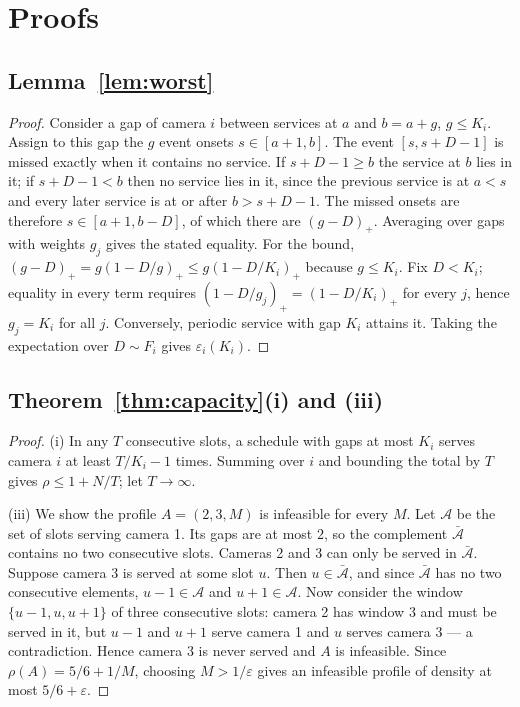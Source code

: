 \documentclass[final,5p,times,twocolumn]{elsarticle}
\theoremstyle{definition}
\newcommand{\Nc}{N}
\newcommand{\Ki}{K_i}
\newcommand{\dens}{\rho}
\newcommand{\Dur}{D}
\newcommand{\pos}[1]{(#1)_{+}}
\begin{document}
\appendix
\section{Proofs}\label{app:proofs}

\subsection*{Lemma~\ref{lem:worst}}
\begin{proof}
Consider a gap of camera $i$ between services at $a$ and $b=a+g$, $g\le\Ki$. Assign to this gap
the $g$ event onsets $s\in[a+1,b]$. The event $[s,s+\Dur-1]$ is missed exactly when it contains no
service. If $s+\Dur-1\ge b$ the service at $b$ lies in it; if $s+\Dur-1<b$ then no service lies in
it, since the previous service is at $a<s$ and every later service is at or after $b>s+\Dur-1$.
The missed onsets are therefore $s\in[a+1,b-\Dur]$, of which there are $\pos{g-\Dur}$. Averaging
over gaps with weights $g_j$ gives the stated equality. For the bound, $\pos{g-\Dur}=g\pos{1-\Dur/g}
\le g\pos{1-\Dur/\Ki}$ because $g\le\Ki$. Fix $\Dur<\Ki$; equality in every term requires
$\pos{1-\Dur/g_j}=\pos{1-\Dur/\Ki}$ for every $j$, hence $g_j=\Ki$ for all $j$. Conversely,
periodic service with gap $\Ki$ attains it. Taking the expectation over $\Dur\sim F_i$ gives
$\varepsilon_i(\Ki)$.
\end{proof}

\subsection*{Theorem~\ref{thm:capacity}(i) and (iii)}
\begin{proof}
(i) In any $T$ consecutive slots, a schedule with gaps at most $\Ki$ serves camera $i$ at least
$T/\Ki-1$ times. Summing over $i$ and bounding the total by $T$ gives $\dens\le1+\Nc/T$; let
$T\to\infty$.

(iii) We show the profile $A=(2,3,M)$ is infeasible for every $M$. Let $\mathcal{A}$ be the set of
slots serving camera 1. Its gaps are at most $2$, so the complement $\bar{\mathcal{A}}$ contains no
two consecutive slots. Cameras 2 and 3 can only be served in $\bar{\mathcal{A}}$. Suppose camera 3
is served at some slot $u$. Then $u\in\bar{\mathcal{A}}$, and since $\bar{\mathcal{A}}$ has no two
consecutive elements, $u-1\in\mathcal{A}$ and $u+1\in\mathcal{A}$. Now consider the window
$\{u-1,u,u+1\}$ of three consecutive slots: camera 2 has window $3$ and must be served in it, but
$u-1$ and $u+1$ serve camera 1 and $u$ serves camera 3 --- a contradiction. Hence camera 3 is
never served and $A$ is infeasible. Since $\dens(A)=5/6+1/M$, choosing $M>1/\varepsilon$ gives an
infeasible profile of density at most $5/6+\varepsilon$.
\end{proof}
\end{document}
